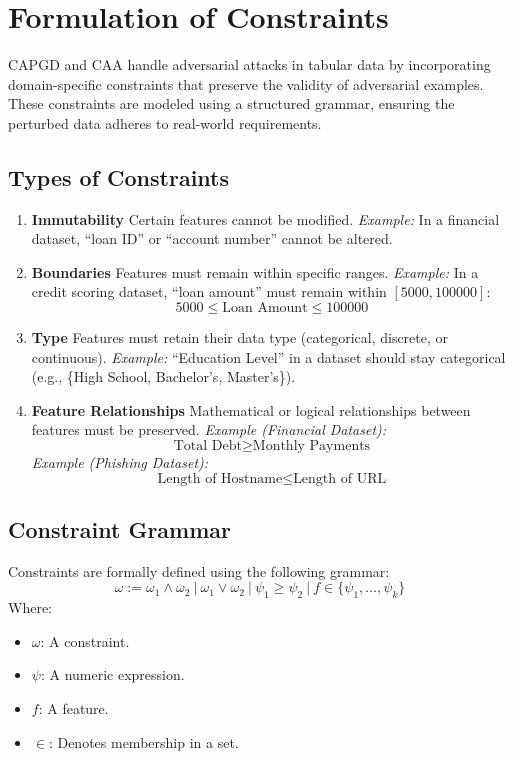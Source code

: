 \documentclass{article}
\begin{document}
\section*{Formulation of Constraints}

CAPGD and CAA handle adversarial attacks in tabular data by incorporating domain-specific constraints that preserve the validity of adversarial examples. These constraints are modeled using a structured grammar, ensuring the perturbed data adheres to real-world requirements.

\subsection*{Types of Constraints}

\begin{enumerate}
    \item \textbf{Immutability}  
    Certain features cannot be modified.  
    \textit{Example:} In a financial dataset, ``loan ID'' or ``account number'' cannot be altered.

    \item \textbf{Boundaries}  
    Features must remain within specific ranges.  
    \textit{Example:} In a credit scoring dataset, ``loan amount'' must remain within $[5000, 100000]$:  
    \[
    5000 \leq \text{Loan Amount} \leq 100000
    \]

    \item \textbf{Type}  
    Features must retain their data type (categorical, discrete, or continuous).  
    \textit{Example:} ``Education Level'' in a dataset should stay categorical (e.g., \{High School, Bachelor’s, Master’s\}).

    \item \textbf{Feature Relationships}  
    Mathematical or logical relationships between features must be preserved.  
    \textit{Example (Financial Dataset):}  
    \[
    \text{Total Debt} \geq \text{Monthly Payments}
    \]
    \textit{Example (Phishing Dataset):}  
    \[
    \text{Length of Hostname} \leq \text{Length of URL}
    \]
\end{enumerate}

\subsection*{Constraint Grammar}

Constraints are formally defined using the following grammar:
\[
\omega := \omega_1 \land \omega_2 \ | \ \omega_1 \lor \omega_2 \ | \ \psi_1 \geq \psi_2 \ | \ f \in \{\psi_1, \ldots, \psi_k\}
\]
Where:
\begin{itemize}
    \item $\omega$: A constraint.
    \item $\psi$: A numeric expression.
    \item $f$: A feature.
    \item $\in$: Denotes membership in a set.
\end{itemize}
\end{document}
